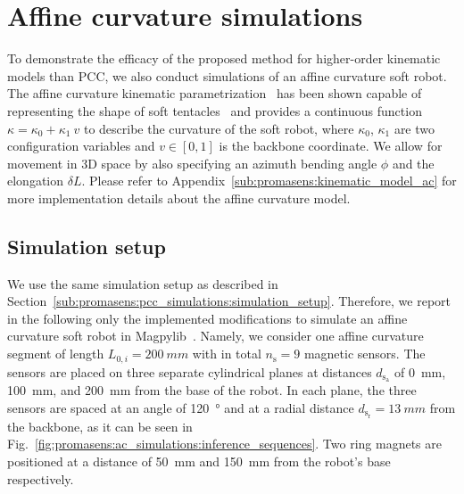 \section{Affine curvature simulations}\label{sec:promasens:ac_simulations}
To demonstrate the efficacy of the proposed method for higher-order kinematic models than \gls{PCC}, we also conduct simulations of an affine curvature soft robot.
The affine curvature kinematic parametrization~\cite{della2020soft} has been shown capable of representing the shape of soft tentacles~\cite{stella2022experimental, stella2022piecewise_preprint} and provides a continuous function $\kappa = \kappa_0 + \kappa_1 \: v$ to describe the curvature of the soft robot, where $\kappa_0$, $\kappa_1$ are two configuration variables and $v \in [0, 1]$ is the backbone coordinate. We allow for movement in 3D space by also specifying an azimuth bending angle $\phi$ and the elongation $\delta L$.
Please refer to Appendix~\ref{sub:promasens:kinematic_model_ac} for more implementation details about the affine curvature model.


\subsection{Simulation setup}\label{sub:promasens:ac_simulations:simulation_setup}
We use the same simulation setup as described in Section~\ref{sub:promasens:pcc_simulations:simulation_setup}. 
Therefore, we report in the following only the implemented modifications to simulate an affine curvature soft robot in Magpylib~\cite{magpylib2020}.
Namely, we consider one affine curvature segment of length $L_{0,i} = \SI{200}{mm}$ with in total $n_\mathrm{s} = 9$ magnetic sensors. 
The sensors are placed on three separate cylindrical planes at distances $d_{\mathrm{s}_\mathrm{a}}$ of \SI{0}{mm}, \SI{100}{mm}, and \SI{200}{mm} from the base of the robot. In each plane, the three sensors are spaced at an angle of \SI{120}{\degree} and at a radial distance $d_{\mathrm{s}_\mathrm{r}} = \SI{13}{mm}$ from the backbone, as it can be seen in Fig.~\ref{fig:promasens:ac_simulations:inference_sequences}.
Two ring magnets are positioned at a distance of \SI{50}{mm} and \SI{150}{mm} from the robot's base respectively.

